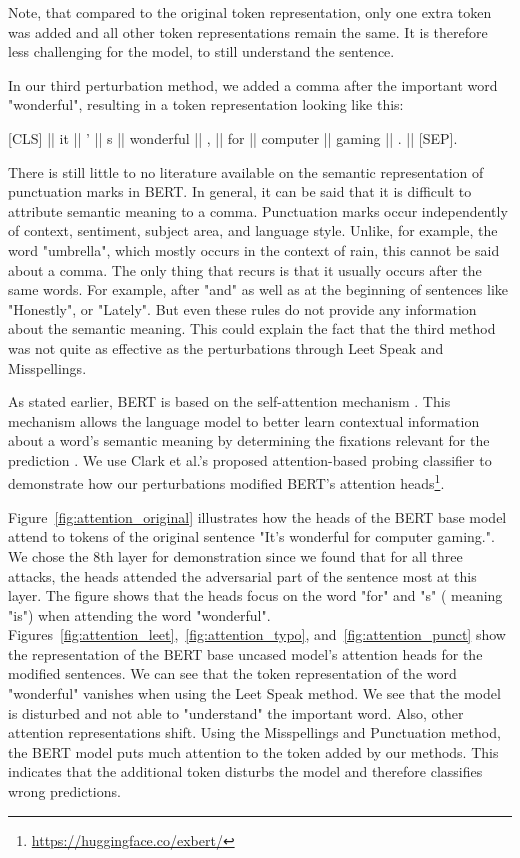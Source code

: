 Note, that compared to the original token representation, only one extra token was added and all other token representations remain the same. It is therefore less challenging for the model, to still understand the sentence. 


In our third perturbation method, we added a comma after the important word "wonderful", resulting in a token representation looking like this:

{[}CLS{]}  ||  it  ||  '  ||  s  ||  wonderful  || , ||  for  ||  computer  ||  gaming  ||  .  ||  {[}SEP{]}.

There is still little to no literature available on the semantic representation of punctuation marks in BERT. In general, it can be said that it is difficult to attribute semantic meaning to a comma. Punctuation marks occur independently of context, sentiment, subject area, and language style. Unlike, for example, the word "umbrella", which mostly occurs in the context of rain, this cannot be said about a comma. The only thing that recurs is that it usually occurs after the same words. For example, after "and" as well as at the beginning of sentences like "Honestly", or "Lately". But even these rules do not provide any information about the semantic meaning. This could explain the fact that the third method was not quite as effective as the perturbations through Leet Speak and Misspellings.

As stated earlier, BERT is based on the self-attention mechanism \cite{devlin2018bert}. This mechanism allows the language model to better learn contextual information about a word's semantic meaning by determining the fixations relevant for the prediction \cite{vaswani2017attention}. We use Clark et al.'s proposed attention-based probing classifier to demonstrate how our perturbations modified BERT's attention heads\footnote{\url{https://huggingface.co/exbert/}}. 

Figure~\ref{fig:attention_original} illustrates how the heads of the BERT base model attend to tokens of the original sentence "It's wonderful for computer gaming.". We chose the 8th layer for demonstration since we found that for all three attacks, the heads attended the adversarial part of the sentence most at this layer.
The figure shows that the heads focus on the word "for" and "s" ( meaning "is") when attending the word "wonderful". 
Figures~\ref{fig:attention_leet},~\ref{fig:attention_typo}, and~\ref{fig:attention_punct} show the representation of the  BERT base uncased model's attention heads for the modified sentences. We can see that the token representation of the word "wonderful" vanishes when using the Leet Speak method. We see that the model is disturbed and not able to "understand" the important word. Also, other attention representations shift. Using the Misspellings and Punctuation method, the BERT model puts much attention to the token added by our methods. This indicates that the additional token disturbs the model and therefore classifies wrong predictions.


